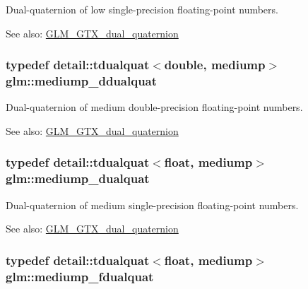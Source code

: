 Dual-quaternion of low single-precision floating-point numbers.

\begin{Desc}
\item[See also:]\hyperlink{group__gtc__dual__quaternion}{GLM\_\-GTX\_\-dual\_\-quaternion} \end{Desc}
\hypertarget{group__gtc__dual__quaternion_g62d8cbf30e2afd0b1044204268a69066}{
\subsubsection[mediump\_\-ddualquat]{\setlength{\rightskip}{0pt plus 5cm}typedef detail::tdualquat$<$double, mediump$>$ {\bf glm::mediump\_\-ddualquat}}}
\label{group__gtc__dual__quaternion_g62d8cbf30e2afd0b1044204268a69066}


Dual-quaternion of medium double-precision floating-point numbers.

\begin{Desc}
\item[See also:]\hyperlink{group__gtc__dual__quaternion}{GLM\_\-GTX\_\-dual\_\-quaternion} \end{Desc}
\hypertarget{group__gtc__dual__quaternion_g71fc1c10a382330c1fee55ce29703405}{
\subsubsection[mediump\_\-dualquat]{\setlength{\rightskip}{0pt plus 5cm}typedef detail::tdualquat$<$float, mediump$>$ {\bf glm::mediump\_\-dualquat}}}
\label{group__gtc__dual__quaternion_g71fc1c10a382330c1fee55ce29703405}


Dual-quaternion of medium single-precision floating-point numbers.

\begin{Desc}
\item[See also:]\hyperlink{group__gtc__dual__quaternion}{GLM\_\-GTX\_\-dual\_\-quaternion} \end{Desc}
\hypertarget{group__gtc__dual__quaternion_gb211d24786158490e57dfa57d7744f71}{
\subsubsection[mediump\_\-fdualquat]{\setlength{\rightskip}{0pt plus 5cm}typedef detail::tdualquat$<$float, mediump$>$ {\bf glm::mediump\_\-fdualquat}}}
\label{group__gtc__dual__quaternion_gb211d24786158490e57dfa57d7744f71}


